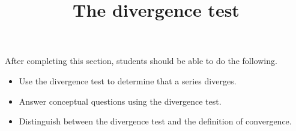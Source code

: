 \documentclass{ximera}
\title{The divergence test}
\begin{document}
\begin{abstract}
\end{abstract}

\maketitle

\begin{sectionOutcomes}

After completing this section, students should be able to do the following.

\begin{itemize}
\item Use the divergence test to determine that a series diverges.
\item Answer conceptual questions using the divergence test.
\item Distinguish between the divergence test and the definition of convergence.
\end{itemize}

\end{sectionOutcomes}
\end{document}
